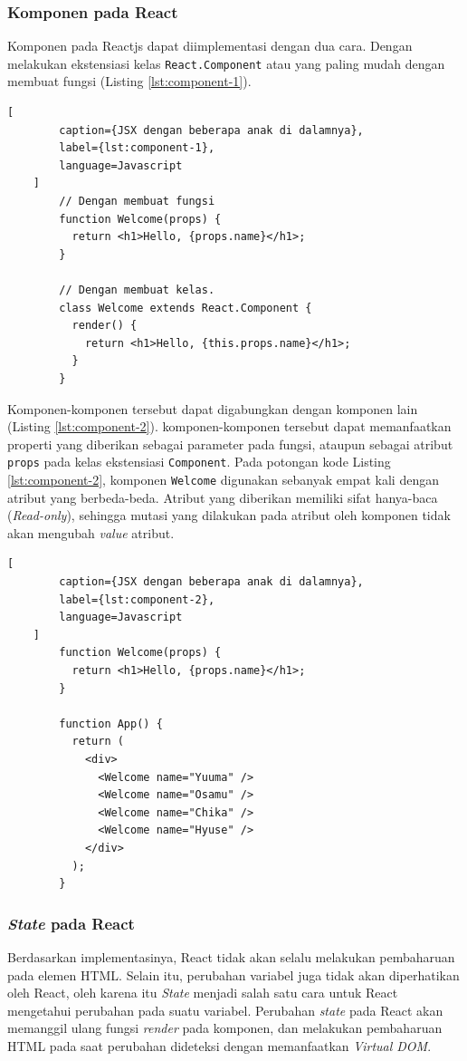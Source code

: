     \subsubsection{Komponen pada React}
    Komponen pada Reactjs dapat diimplementasi dengan dua cara. Dengan melakukan ekstensiasi kelas \texttt{React.Component} atau yang paling mudah dengan membuat fungsi (Listing \ref{lst:component-1}).
    
    \begin{lstlisting}[
        caption={JSX dengan beberapa anak di dalamnya}, 
        label={lst:component-1}, 
        language=Javascript
    ]
        // Dengan membuat fungsi
        function Welcome(props) {
          return <h1>Hello, {props.name}</h1>;
        }
        
        // Dengan membuat kelas.
        class Welcome extends React.Component {
          render() {
            return <h1>Hello, {this.props.name}</h1>;
          }
        }
    \end{lstlisting}
    
    Komponen-komponen tersebut dapat digabungkan dengan komponen lain (Listing \ref{lst:component-2}). komponen-komponen tersebut dapat memanfaatkan properti yang diberikan sebagai parameter pada fungsi, ataupun sebagai atribut \texttt{props} pada kelas ekstensiasi \texttt{Component}. Pada potongan kode Listing \ref{lst:component-2}, komponen \texttt{Welcome} digunakan sebanyak empat kali dengan atribut yang berbeda-beda.
    Atribut yang diberikan memiliki sifat hanya-baca (\textit{Read-only}), sehingga mutasi yang dilakukan pada atribut oleh komponen tidak akan mengubah \textit{value} atribut.
    
    \begin{lstlisting}[
        caption={JSX dengan beberapa anak di dalamnya}, 
        label={lst:component-2}, 
        language=Javascript
    ]
        function Welcome(props) {
          return <h1>Hello, {props.name}</h1>;
        }
        
        function App() {
          return (
            <div>
              <Welcome name="Yuuma" />
              <Welcome name="Osamu" />
              <Welcome name="Chika" />
              <Welcome name="Hyuse" />
            </div>
          );
        }
    \end{lstlisting}
    
    
    \subsubsection{\textit{State} pada React}
    Berdasarkan implementasinya, React tidak akan selalu melakukan pembaharuan pada elemen HTML. Selain itu, perubahan variabel juga tidak akan diperhatikan oleh React, oleh karena itu \textit{State} menjadi salah satu cara untuk React mengetahui perubahan pada suatu variabel.
    Perubahan \textit{state} pada React akan memanggil ulang fungsi \textit{render} pada komponen, dan melakukan pembaharuan HTML pada saat perubahan dideteksi dengan memanfaatkan \textit{Virtual DOM}.
    
